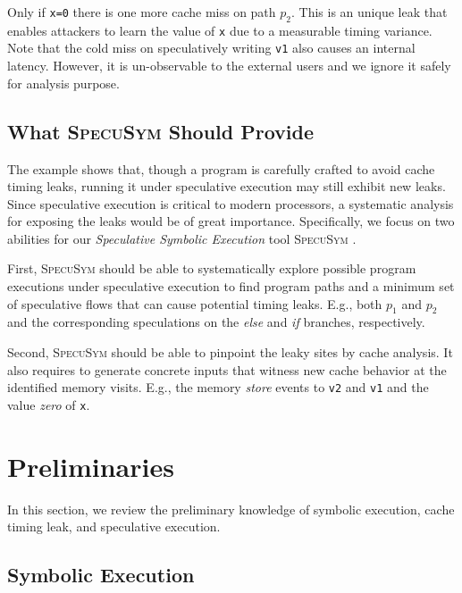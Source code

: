 \documentclass[sigconf]{acmart}
\newcommand{\SpecuSym}{\textsc{SpecuSym} }
\begin{document}
Only if \texttt{x=0} there is one more cache miss on path $p_2$. This is an 
unique leak that enables attackers to learn the 
value of \texttt{x} due to a measurable timing variance. 
Note that the cold miss on speculatively writing \texttt{v1} 
also causes an internal latency. However, it is un-observable to the external 
users and we ignore it safely for analysis purpose.


\subsection{What \SpecuSym Should Provide}
\label{sec:app-scenarios}

The example shows that, though a program is carefully crafted to avoid cache 
timing leaks, running it under speculative execution may still exhibit new 
leaks. Since speculative execution is critical to modern processors, a 
systematic analysis for exposing the leaks would be of great importance. 
Specifically, we focus on two abilities for our \emph{Speculative Symbolic 
Execution} tool \SpecuSym.


First, \SpecuSym should be able to systematically explore possible program 
executions under speculative execution to find program paths and a minimum 
set of speculative flows that can cause potential timing leaks. E.g., both 
$\mathit{p_1}$ and $\mathit{p_2}$ and the corresponding speculations on 
the \textit{else} and \textit{if} branches, respectively.


Second, \SpecuSym should be able to pinpoint the leaky sites by cache analysis. 
It also requires to generate concrete inputs that witness new cache behavior 
at the identified memory visits. E.g., the memory \textit{store} events to 
\texttt{v2} and \texttt{v1} and the value \textit{zero} of \texttt{x}.


\section{Preliminaries}
\label{sec:prelim}

In this section, we review the preliminary knowledge of symbolic execution, cache timing leak, 
and speculative execution.


\subsection{Symbolic Execution}
\label{sec:se}
\end{document}
